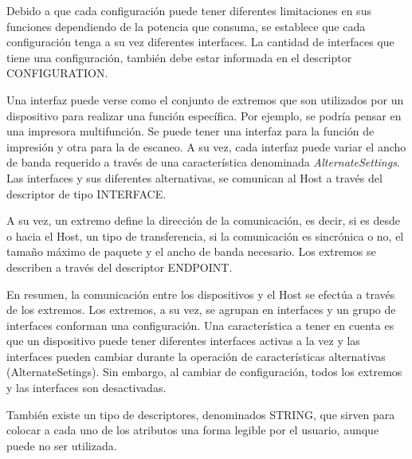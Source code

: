 Debido a que cada configuración puede tener diferentes limitaciones en sus funciones dependiendo de la potencia que consuma, se establece que cada configuración tenga a su vez diferentes interfaces. La cantidad de interfaces que tiene una configuración, también debe estar informada en el descriptor CONFIGURATION.%

Una interfaz puede verse como el conjunto de extremos que son utilizados por un dispositivo para realizar una función específica. Por ejemplo, se podría pensar en una impresora multifunción. Se puede tener una interfaz para la función de impresión y otra para la de escaneo. A su vez, cada interfaz puede variar el ancho de banda requerido a través de una característica denominada \textit{AlternateSettings}. Las interfaces y sus diferentes alternativas, se comunican al Host a través del descriptor de tipo INTERFACE.%

A su vez, un extremo define la dirección de la comunicación, es decir, si es desde o hacia el Host, un tipo de transferencia, si la comunicación es sincrónica o no, el tamaño máximo de paquete y el ancho de banda necesario. Los extremos se describen a través del descriptor ENDPOINT.%

En resumen, la comunicación entre los dispositivos y el Host se efectúa a través de los extremos. Los extremos, a su vez, se agrupan en interfaces y un grupo de interfaces conforman una configuración. Una característica a tener en cuenta es que un dispositivo puede tener diferentes interfaces activas a la vez y las interfaces pueden cambiar durante la operación de características alternativas (AlternateSetings). Sin embargo, al cambiar de configuración, todos los extremos y las interfaces son desactivadas.%

También existe un tipo de descriptores, denominados STRING, que sirven para colocar a cada uno de los atributos una forma legible por el usuario, aunque puede no ser utilizada. 

